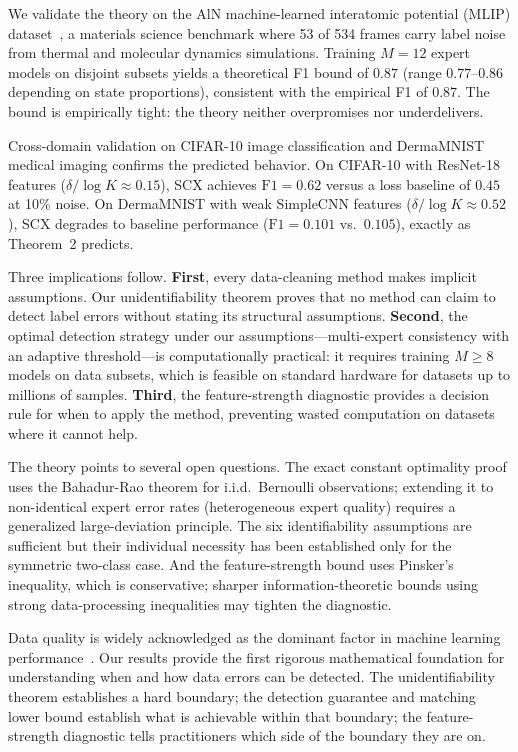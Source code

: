 We validate the theory on the AlN machine-learned interatomic potential (MLIP) dataset~\cite{placeholder}, a materials science benchmark where 53 of 534 frames carry label noise from thermal and molecular dynamics simulations. Training $M=12$ expert models on disjoint subsets yields a theoretical F1 bound of $0.87$ (range $0.77$--$0.86$ depending on state proportions), consistent with the empirical F1 of $0.87$. The bound is empirically tight: the theory neither overpromises nor underdelivers.

Cross-domain validation on CIFAR-10 image classification and DermaMNIST medical imaging confirms the predicted behavior. On CIFAR-10 with ResNet-18 features ($\delta / \log K \approx 0.15$), SCX achieves $\mathrm{F1}=0.62$ versus a loss baseline of $0.45$ at 10\% noise. On DermaMNIST with weak SimpleCNN features ($\delta / \log K \approx 0.52$), SCX degrades to baseline performance ($\mathrm{F1}=0.101$ vs.\ $0.105$), exactly as Theorem~2 predicts.

Three implications follow. \textbf{First}, every data-cleaning method makes implicit assumptions. Our unidentifiability theorem proves that no method can claim to detect label errors without stating its structural assumptions. \textbf{Second}, the optimal detection strategy under our assumptions---multi-expert consistency with an adaptive threshold---is computationally practical: it requires training $M \geq 8$ models on data subsets, which is feasible on standard hardware for datasets up to millions of samples. \textbf{Third}, the feature-strength diagnostic provides a decision rule for when to apply the method, preventing wasted computation on datasets where it cannot help.

The theory points to several open questions. The exact constant optimality proof uses the Bahadur-Rao theorem for i.i.d.\ Bernoulli observations; extending it to non-identical expert error rates (heterogeneous expert quality) requires a generalized large-deviation principle. The six identifiability assumptions are sufficient but their individual necessity has been established only for the symmetric two-class case. And the feature-strength bound uses Pinsker's inequality, which is conservative; sharper information-theoretic bounds using strong data-processing inequalities may tighten the diagnostic.

Data quality is widely acknowledged as the dominant factor in machine learning performance~\cite{placeholder}. Our results provide the first rigorous mathematical foundation for understanding when and how data errors can be detected. The unidentifiability theorem establishes a hard boundary; the detection guarantee and matching lower bound establish what is achievable within that boundary; the feature-strength diagnostic tells practitioners which side of the boundary they are on.

